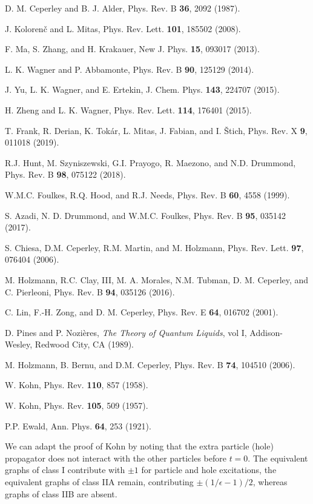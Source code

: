 \begin{thebibliography}{99}
 D. M. Ceperley and B. J. Alder, Phys. Rev. B {\bf 36}, 2092 (1987).

 J. Koloren{\v{c}} and L. Mitas, Phys. Rev. Lett. {\bf 101}, 185502 (2008).

  F. Ma, S. Zhang, and H. Krakauer, New J. Phys. {\bf 15}, 093017 (2013).


 L. K. Wagner and P. Abbamonte,
Phys. Rev. B {\bf 90}, 125129 (2014).

 J. Yu, L. K. Wagner, and E. Ertekin, J. Chem. Phys. {\bf 143}, 224707 (2015).

 H. Zheng and L. K. Wagner,
Phys. Rev. Lett. {\bf 114}, 176401 (2015).

 T. Frank, R. Derian, K. Tok{\'a}r, L. Mitas, J. Fabian, and I. \ifmmode {}\else \v{S}\fi{}tich, Phys. Rev. X {\bf 9}, 011018 (2019).

 R.J. Hunt, M. Szyniszewski, G.I. Prayogo, R. Maezono, and N.D. Drummond, Phys. Rev. B
{\bf 98}, 075122 (2018).

 W.M.C. Foulkes, R.Q. Hood, and R.J. Needs, Phys. Rev. B {\bf 60}, 4558 (1999).

 S. Azadi, N. D. Drummond, and W.M.C. Foulkes, Phys. Rev. B {\bf 95}, 035142 (2017).

 S. Chiesa, D.M. Ceperley, R.M. Martin, and M. Holzmann,
Phys. Rev. Lett. {\bf 97}, 076404 (2006).

 M. Holzmann, R.C. Clay, III, M. A. Morales, N.M. Tubman, D. M. Ceperley, and C. Pierleoni,
Phys. Rev. B {\bf 94}, 035126 (2016).

 C. Lin, F.-H. Zong, and D. M. Ceperley, Phys. Rev. E {\bf 64}, 016702 (2001).

 D. Pines and P. Nozi{\`e}res, {\em The Theory of Quantum Liquids}, vol I, 
Addison-Wesley, Redwood City, CA (1989).

 M. Holzmann, B. Bernu, and D.M. Ceperley,
Phys. Rev. B {\bf 74}, 104510 (2006).

 W. Kohn, Phys. Rev. {\bf 110}, 857 (1958).

 W. Kohn, Phys. Rev. {\bf 105}, 509 (1957).

  P.P. Ewald, Ann. Phys. {\bf 64}, 253  (1921).

 We can adapt the proof of Kohn \cite{Kohn58}
 by noting that 
the extra particle (hole) propagator does not interact with the other particles before $t=0$.
The equivalent graphs of class I contribute with $\pm 1$ for particle and hole excitations,
the equivalent graphs of class IIA remain, contributing $\pm (1/\epsilon -1)/2$, whereas graphs of
class IIB are absent.


\end{thebibliography}
